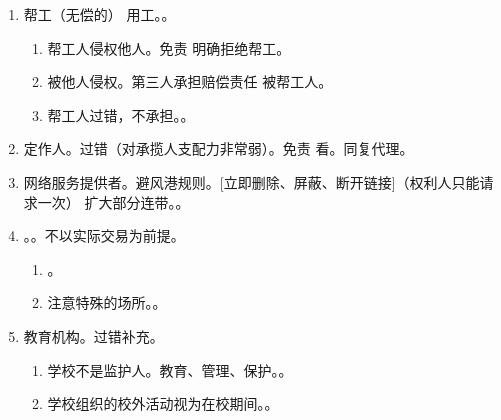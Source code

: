 \begin{enumerate}
\begin{enumerate}
        \end{enumerate}
  \item 帮工（无偿的） \ydy 用工。。
        \begin{enumerate}
          \item 帮工人侵权他人。免责 \yjt 明确拒绝帮工。
          \item 被他人侵权。第三人承担赔偿责任 \hz 被帮工人。
          \item 帮工人过错，不承担。。
        \end{enumerate}
  \item 定作人。过错（对承揽人支配力非常弱）。免责 \yjt 看。同复代理。
  \item 网络服务提供者。避风港规则。[立即删除、屏蔽、断开链接]（权利人只能请求一次） \yjt 扩大部分连带。。
  \item {}。。不以实际交易为前提。
        \begin{enumerate}
          \item {}。
          \item 注意特殊的场所。。
        \end{enumerate}
  \item 教育机构。过错补充。
        \begin{enumerate}
          \item 学校不是监护人。教育、管理、保护。。
          \item 学校组织的校外活动视为在校期间。。
        \end{enumerate}
\end{enumerate}
